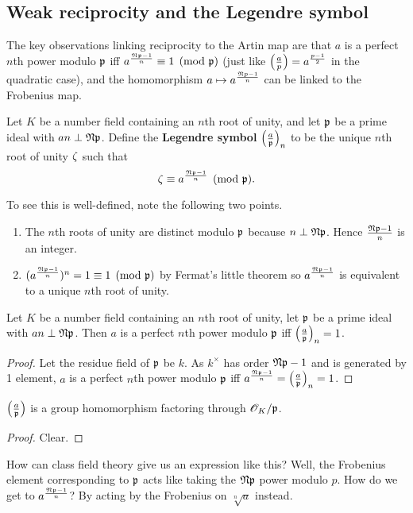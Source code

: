 \subsection{Weak reciprocity and the Legendre symbol}
The key observations linking reciprocity to the Artin map are that $a$ is a perfect $n$th power modulo $\mathfrak{p}$ iff $a^{\frac{\mathfrak{N} \mathfrak{p}-1}{n}}\equiv 1\pmod{\mathfrak{p}}$ (just like $\left( {\frac{a}{p}} \right)=a^{\frac{p-1}{2}}$ in the quadratic case), and the homomorphism $a\mapsto a^{\frac{\mathfrak{N} p-1}{n}}$ can be linked to the Frobenius map.
\begin{df}
Let $K$ be a number field containing an $n$th root of unity, and let $\mathfrak{p}$ be a prime ideal with $an\perp \mathfrak N\mathfrak{p}$. Define the \textbf{Legendre symbol} $\left( {\frac{a}{\mathfrak{p}}} \right)_n$ to be the unique $n$th root of unity $\zeta$ such that 
\[
\zeta\equiv a^{\frac{\mathfrak N \mathfrak{p}-1}{n}}\pmod{\mathfrak{p}}.
\]
\end{df}
To see this is well-defined, note the following two points.
\begin{enumerate}
\item
The $n$th roots of unity are distinct modulo $\mathfrak{p}$ because $n\perp \mathfrak{N}\mathfrak{p}$. Hence $\frac{\mathfrak{N} \mathfrak{p}-1}{n}$ is an integer.
\item
$(a^{\frac{\mathfrak{N}\mathfrak{p}-1}{n}})^n=1\equiv 1\pmod{\mathfrak{p}}$ by Fermat's little theorem so $a^{\frac{\mathfrak{N}\mathfrak{p}-1}{n}}$ is equivalent to a unique $n$th root of unity.
\end{enumerate}
\begin{pr}
Let $K$ be a number field containing an $n$th root of unity, let $\mathfrak{p}$ be a prime ideal with $an\perp \mathfrak N\mathfrak{p}$.
Then $a$ is a perfect $n$th power modulo $\mathfrak{p}$ iff $\left( {\frac{a}{\mathfrak{p}}} \right)_n=1$.
\end{pr}
\begin{proof}
Let the residue field of $\mathfrak{p}$ be $k$. 
As $k^{\times}$ has order $\mathfrak N \mathfrak{p}-1$ and is generated by 1 element, $a$ is a perfect $n$th power modulo $\mathfrak{p}$ iff $a^{\frac{\mathfrak{N} \mathfrak{p}-1}{n}}=\left( {\frac{a}{\mathfrak{p}}} \right)_n=1$.
\end{proof}
\begin{pr}
$\left( {\frac{a}{\mathfrak{p}}} \right)$ is a group homomorphism factoring through $\mathscr{O}_K/\mathfrak{p}$.
\end{pr}
\begin{proof}
Clear.
\end{proof}
How can class field theory give us an expression like this? Well, the Frobenius element corresponding to $\mathfrak{p}$ acts like taking the $\mathfrak N\mathfrak{p}$ power modulo $p$. How do we get to $a^{\frac{\mathfrak N \mathfrak{p}-1}{n}}$? By acting by the Frobenius on $\sqrt[n]{a}$ instead.
